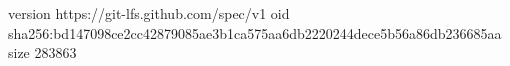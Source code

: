 version https://git-lfs.github.com/spec/v1
oid sha256:bd147098ce2cc42879085ae3b1ca575aa6db2220244dece5b56a86db236685aa
size 283863
